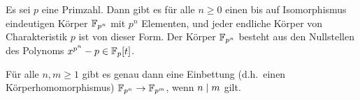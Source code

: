 \begin{theorem}
  Es sei $p$ eine Primzahl.
  Dann gibt es für alle $n \geq 0$ einen bis auf Isomorphismus eindeutigen Körper $\mathbb{F}_{p^n}$ mit $p^n$ Elementen, und jeder endliche Körper von Charakteristik $p$ ist von dieser Form.
  Der Körper $\mathbb{F}_{p^n}$ besteht aus den Nullstellen des Polynoms $x^{p^n} - p \in \mathbb{F}_p[t]$.
\end{theorem}

\begin{lemma}
  Für alle $n, m \geq 1$ gibt es genau dann eine Einbettung \textup(d.h.\ einen Körperhomomorphismus\textup) $\mathbb{F}_{p^n} \to \mathbb{F}_{p^m}$, wenn $n \mathrel{|} m$ gilt.
\end{lemma}





